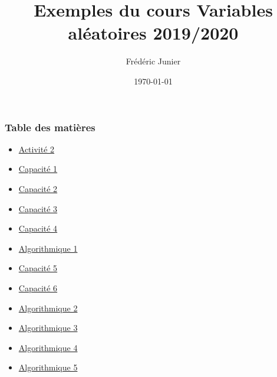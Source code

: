 \documentclass[11pt, hyperref={urlcolor=red,%
            linkcolor=blue, %
            colorlinks=true}]{beamer}
\title[suites]{Exemples du cours Variables aléatoires 2019/2020}
\author[F.Junier]{Fr\'ed\'eric Junier}
\institute[Le Parc]{{\centering Lyc\'ee du Parc \\
1 Boulevard Anatole France \\ 69006 Lyon }}
\date[\today]{\today}
\begin{document}
\frame{\titlepage}

 


\begin{frame}
\frametitle{Table des matières}
\begin{itemize}
    \item \hyperlink{activite2}{Activité 2}
    \item \hyperlink{capacite1}{Capacité 1}
    \item \hyperlink{capacite2}{Capacité 2}
    \item \hyperlink{capacite3}{Capacité 3}
    \item \hyperlink{capacite4}{Capacité 4}
     \item \hyperlink{algo1}{Algorithmique 1}
     \item \hyperlink{capacite5}{Capacité 5}
    \item \hyperlink{capacite6}{Capacité 6}
    \item \hyperlink{algo2}{Algorithmique 2}
     \item \hyperlink{algo3}{Algorithmique 3}
       \item \hyperlink{algo4}{Algorithmique 4}
        \item \hyperlink{algo5}{Algorithmique 5}
\end{itemize}

\end{frame}
\end{document}
